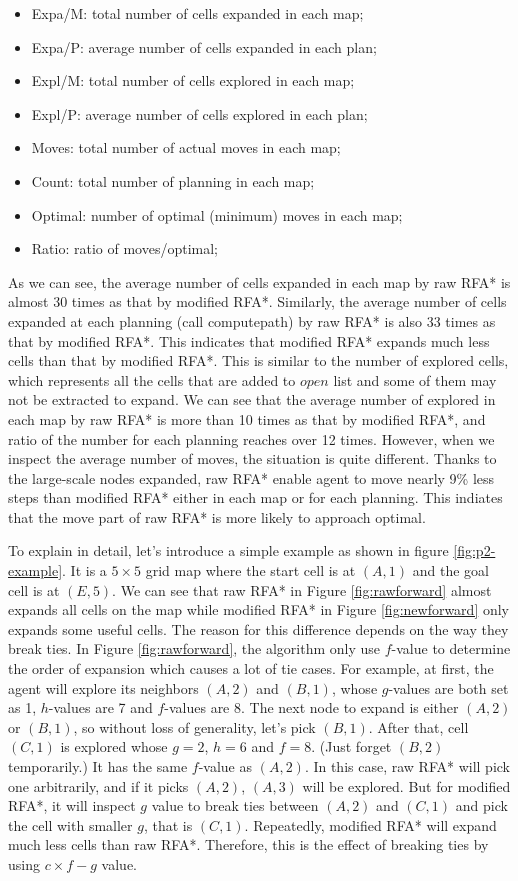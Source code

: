 \begin{itemize}
\item Expa/M: total number of cells expanded in each map;
\item Expa/P: average number of cells expanded in each plan;
\item Expl/M: total number of cells explored in each map;
\item Expl/P: average number of cells explored in each plan;
\item Moves: total number of actual moves in each map;
\item Count: total number of planning in each map;
\item Optimal: number of optimal (minimum) moves in each map;
\item Ratio: ratio of moves/optimal;
\end{itemize}

As we can see, the average number of cells expanded in each map by raw RFA* is
almost 30 times as that by modified RFA*. Similarly, the average number of
cells expanded at each planning (call computepath) by raw RFA* is also 33 times
as that by modified RFA*. This indicates that modified RFA* expands much less
cells than that by modified RFA*. This is similar to the number of explored
cells, which represents all the cells that are added to $open$ list and some of
them may not be extracted to expand. We can see that the average number of
explored in each map by raw RFA* is more than 10 times as that by modified
RFA*, and ratio of the number for each planning reaches over 12 times. However,
when we inspect the average number of moves, the situation is quite different.
Thanks to the large-scale nodes expanded, raw RFA* enable agent to move nearly
9\% less steps than modified RFA* either in each map or for each planning. This
indiates that the move part of raw RFA* is more likely to approach optimal.

To explain in detail, let's introduce a simple example as shown in figure
\ref{fig:p2-example}. It is a $5\times 5$ grid map where the start cell is at
$(A,1)$ and the goal cell is at $(E,5)$.  We can see that raw RFA* in Figure
\ref{fig:rawforward} almost expands all cells on the map while modified RFA* in
Figure \ref{fig:newforward} only expands some useful cells. The reason for this
difference depends on the way they break ties. In Figure \ref{fig:rawforward},
the algorithm only use $f$-value to determine the order of expansion which
causes a lot of tie cases. For example, at first, the agent will explore its
neighbors $(A,2)$ and $(B,1)$, whose $g$-values are both set as 1, $h$-values
are 7 and $f$-values are 8. The next node to expand is either $(A,2)$ or
$(B,1)$, so without loss of generality, let's pick $(B,1)$. After that, cell
$(C,1)$ is explored whose $g=2$, $h=6$ and $f=8$. (Just forget $(B,2)$
temporarily.) It has the same $f$-value as $(A,2)$.  In this case, raw RFA*
will pick one arbitrarily, and if it picks $(A,2)$, $(A,3)$ will be explored.
But for modified RFA*, it will inspect $g$ value to break ties between $(A,2)$
and $(C,1)$ and pick the cell with smaller $g$, that is $(C,1)$. Repeatedly,
modified RFA* will expand much less cells than raw RFA*. Therefore, this is the
effect of breaking ties by using $c\times f-g$ value.

